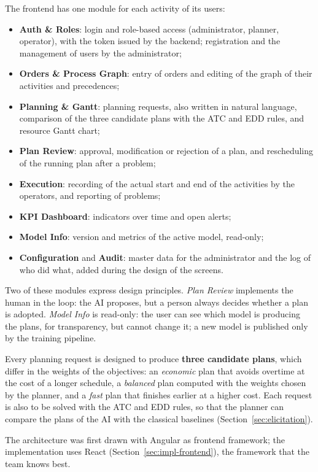 The frontend has one module for each activity of its users:
\begin{itemize}
  \item \textbf{Auth \& Roles}: login and role-based access (administrator, planner,
        operator), with the token issued by the backend; registration and the management of
        users by the administrator;
  \item \textbf{Orders \& Process Graph}: entry of orders and editing of the graph of their
        activities and precedences;
  \item \textbf{Planning \& Gantt}: planning requests, also written in natural language,
        comparison of the three candidate plans with the ATC and EDD rules, and resource Gantt
        chart;
  \item \textbf{Plan Review}: approval, modification or rejection of a plan, and rescheduling
        of the running plan after a problem;
  \item \textbf{Execution}: recording of the actual start and end of the activities by the
        operators, and reporting of problems;
  \item \textbf{KPI Dashboard}: indicators over time and open alerts;
  \item \textbf{Model Info}: version and metrics of the active model, read-only;
  \item \textbf{Configuration} and \textbf{Audit}: master data for the administrator and the
        log of who did what, added during the design of the screens.
\end{itemize}
Two of these modules express design principles. \emph{Plan Review} implements the human in the
loop: the AI proposes, but a person always decides whether a plan is adopted. \emph{Model Info}
is read-only: the user can see which model is producing the plans, for transparency, but cannot
change it; a new model is published only by the training pipeline.

Every planning request is designed to produce \textbf{three candidate plans}, which differ in the weights of
the objectives: an \emph{economic} plan that avoids overtime at the cost of a longer schedule,
a \emph{balanced} plan computed with the weights chosen by the planner, and a \emph{fast} plan
that finishes earlier at a higher cost. Each request is also to be solved with the ATC and EDD rules,
so that the planner can compare the plans of the AI with the classical baselines
(Section~\ref{sec:elicitation}).

The architecture was first drawn with Angular as frontend framework; the implementation uses
React (Section~\ref{sec:impl-frontend}), the framework that the team knows best.

